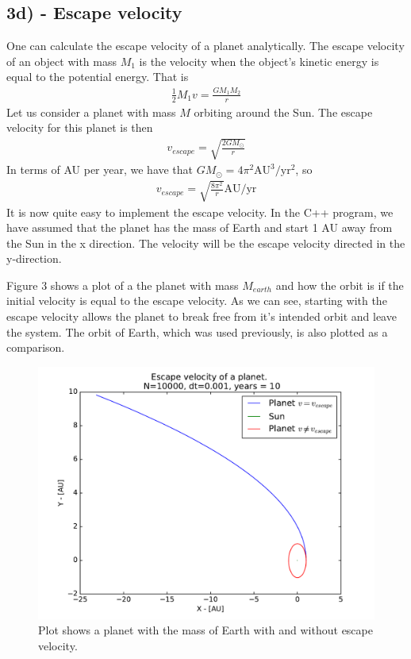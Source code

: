 \documentclass[12pt]{article}
\begin{document}
\subsection*{3d) - Escape velocity}
One can calculate the escape velocity of a planet analytically. The escape velocity of an object with mass $M_1$ is the velocity when the object's kinetic energy is equal to the potential energy. That is
\begin{align*}
\frac{1}{2}M_1v = \frac{GM_1M_2}{r}
\end{align*}
Let us consider a planet with mass $M$ orbiting around the Sun. The escape velocity for this planet is then
\begin{align*}
v_{escape} = \sqrt{\frac{2GM_{\odot}}{r}}
\end{align*}
In terms of AU per year, we have that $GM_{\odot} = 4\pi^2 \text{AU}^3/\text{yr}^2$, so
\begin{align*}
v_{escape} = \sqrt{\frac{8\pi^2}{r}} \text{AU}/\text{yr}
\end{align*}
It is now quite easy to implement the escape velocity. In the C++ program, we have assumed that the planet has the mass of Earth and start 1 AU away from the Sun in the x direction. The velocity will be the escape velocity directed in the y-direction. 

Figure 3 shows a plot of a the planet with mass $M_{earth}$ and how the orbit is if the initial velocity is equal to the escape velocity. As we can see, starting with the escape velocity allows the planet to break free from it's intended orbit and leave the system. The orbit of Earth, which was used previously, is also plotted as a comparison.

\begin{figure}[hbtp]
\centering
\includegraphics[width=\linewidth]{Plots/Escape_velocity.pdf}
\caption{Plot shows a planet with the mass of Earth with and without escape velocity.}
\end{figure}
\end{document}
